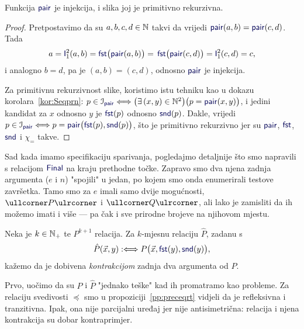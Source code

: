 \begin{propozicija}[{name=[injektivnost i primitivna rekurzivnost slike sparivanja]}]
Funkcija $\f{pair}$ je injekcija, i slika joj je primitivno rekurzivna.
\end{propozicija}
\begin{proof}
Pretpostavimo da su $a,b,c,d\in{\mathbb N}$ takvi da vrijedi $\f{pair}(a,b)=\f{pair}(c,d)$. Tada
\begin{equation}
    a=\f I_1^2(a,b)=\f{fst}\bigl(\f{pair}(a,b)\bigr)=\,
    \f{fst}\bigl(\f{pair}(c,d)\bigr)=\f I_1^2(c,d)=c\text,
\end{equation}
i analogno $b=d$, pa je $(a,b)=(c,d)$, odnosno $\f{pair}$ je injekcija.

Za primitivnu rekurzivnost slike, koristimo istu tehniku kao u dokazu korolara~\ref{kor:Seqprn}: $p\in\im{\f{pair}}\Longleftrightarrow\bigl(\exists\,(x,y)\in\N^2\bigr)\bigl(p=\f{pair}(x,y)\bigr)$, i jedini kandidat za $x$ odnosno $y$ je $\f{fst}(p)$ odnosno $\f{snd}(p)$. Dakle, vrijedi
    $p\in\im{\f{pair}}\Longleftrightarrow p=\f{pair}\bigl(\f{fst}(p),\f{snd}(p)\bigr)$,
što je primitivno rekurzivno jer su $\f{pair}$, $\f{fst}$, $\f{snd}$ i $\chi_=$ takve.
\end{proof}

Sad kada imamo specifikaciju sparivanja, pogledajmo detaljnije što smo napravili s relacijom $\f{Final}$ na kraju prethodne točke. Zapravo smo dva njena zadnja argumenta ($e$ i $n$) "spojili" u jedan, po kojem smo onda enumerirali testove završetka. Tamo smo za $e$ imali samo dvije mogućnosti, $\kprog P$ i $\kprog Q$, ali lako je zamisliti da ih možemo imati i više --- pa čak i sve prirodne brojeve na njihovom mjestu.

\begin{definicija}[{name=[kontrakcija brojevne relacije]}]
Neka je $k\in{\mathbb N}_+$ te $P^{k+1}$ relacija. Za $k$-mjesnu relaciju $\hat P$, zadanu s
\begin{equation}
    \hat P(\vec x,y):\Longleftrightarrow P\bigl(\vec x,\f{fst}(y),\f{snd}(y)\bigr)\text,
\end{equation}
kažemo da je dobivena \emph{kontrakcijom} zadnja dva argumenta od $P$.
\end{definicija}

Prvo, uočimo da su $P$ i $\hat P$ "jednako teške" kad ih promatramo kao probleme. Za relaciju svedivosti $\preceq$ smo u propoziciji~\ref{pp:preceqrt} vidjeli da je refleksivna i tranzitivna. Ipak, ona nije parcijalni uređaj jer nije antisimetrična: relacija i njena kontrakcija su dobar kontraprimjer.

